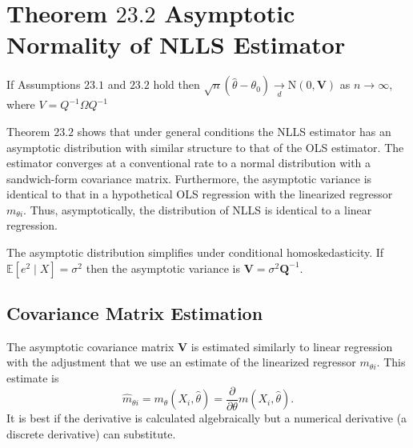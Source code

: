 \documentclass[10pt]{article}
\begin{document}
\section{Theorem $23.2$ Asymptotic Normality of NLLS Estimator}
If Assumptions $23.1$ and $23.2$ hold then $\sqrt{n}\left(\widehat{\theta}-\theta_{0}\right) \underset{d}{\longrightarrow} \mathrm{N}(0, \boldsymbol{V})$ as $n \rightarrow \infty$, where $V=Q^{-1} \Omega Q^{-1}$

Theorem $23.2$ shows that under general conditions the NLLS estimator has an asymptotic distribution with similar structure to that of the OLS estimator. The estimator converges at a conventional rate to a normal distribution with a sandwich-form covariance matrix. Furthermore, the asymptotic variance is identical to that in a hypothetical OLS regression with the linearized regressor $m_{\theta i}$. Thus, asymptotically, the distribution of NLLS is identical to a linear regression.

The asymptotic distribution simplifies under conditional homoskedasticity. If $\mathbb{E}\left[e^{2} \mid X\right]=\sigma^{2}$ then the asymptotic variance is $\boldsymbol{V}=\sigma^{2} \boldsymbol{Q}^{-1}$.

\subsection{Covariance Matrix Estimation}
The asymptotic covariance matrix $\boldsymbol{V}$ is estimated similarly to linear regression with the adjustment that we use an estimate of the linearized regressor $m_{\theta i}$. This estimate is
$$
\widehat{m}_{\theta i}=m_{\theta}\left(X_{i}, \widehat{\theta}\right)=\frac{\partial}{\partial \theta} m\left(X_{i}, \widehat{\theta}\right) .
$$
It is best if the derivative is calculated algebraically but a numerical derivative (a discrete derivative) can substitute.
\end{document}
